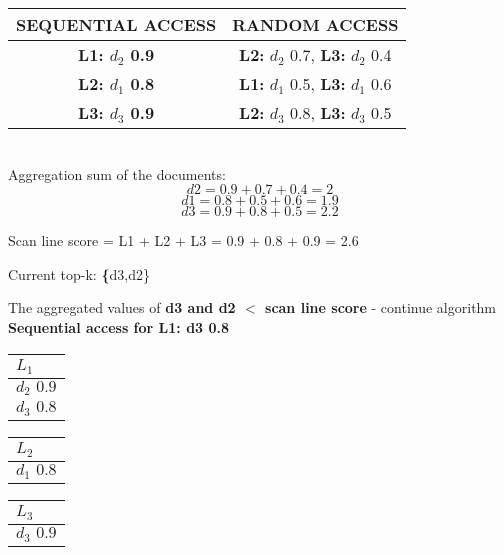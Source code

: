 \begin{tabular}{ |c|c| } 
 \hline
  \textbf{SEQUENTIAL ACCESS} & \textbf{RANDOM ACCESS}  \\ [0.5ex] 
 \hline\hline
 \textbf{ L1: $d_2$ 0.9} &  \textbf{L2:} $d_2$ 0.7, \textbf{L3:} $d_2$ 0.4 \\ 
  \hline
  \textbf{ L2: $d_1$ 0.8} &  \textbf{L1:} $d_1$ 0.5,\textbf{ L3:} $d_1$ 0.6 \\
  \hline
   \textbf{ L3: $d_3$ 0.9} & \textbf{ L2:} $d_3$ 0.8, \textbf{L3:} $d_3$ 0.5 \\
 \hline
\end{tabular}
\\

Aggregation sum of the documents:
\[d2 = 0.9 + 0.7 + 0.4 = 2 \]
\[d1 = 0.8 + 0.5 + 0.6 = 1.9 \] 
\[d3 = 0.9 + 0.8 + 0.5 = 2.2 \]

Scan line score = L1 + L2 + L3 = 0.9 + 0.8 + 0.9 = 2.6

Current top-k: \textbf\{{d3,d2}\}

The aggregated values of\textbf{ d3 and d2 $<$ scan line score} - continue algorithm
\\
\textbf{Sequential access for L1: d3 0.8}
\\
\begin{center}
    \begin{minipage}[t]{2cm}
        \begin{tabular}{|p{25pt}|}\hline
          $L_1$\\\hline
          $d_2 \, \, 0.9$\\\hline
          $d_3 \, \, 0.8$\\\hline
        \end{tabular}
    \end{minipage}
    \hspace{5mm}
    \begin{minipage}[t]{2cm}
        \begin{tabular}{|p{25pt}|}\hline
          $L_2$\\\hline
          $d_1 \, \, 0.8$\\\hline
            \end{tabular}
    \end{minipage}
    \hspace{5mm}
    \begin{minipage}[t]{2cm}
        \begin{tabular}{|p{25pt}|}\hline
        $L_3$\\\hline
        $d_3 \, \, 0.9$\\\hline      
        \end{tabular}
    \end{minipage}
    \end{center}

